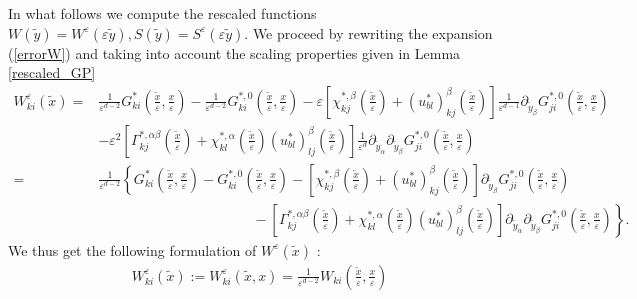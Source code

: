 \documentclass[11pt, reqno]{amsart}
\theoremstyle{definition}
\theoremstyle{remark}
\numberwithin{equation}{section}
\begin{document}
	
	\noindent	 In what follows we compute the rescaled  functions $W(\tilde{y})=W^\varepsilon(\varepsilon\tilde{y}),S(\tilde{y})=S^\varepsilon(\varepsilon\tilde{y})$.  We proceed by rewriting the expansion  (\ref{errorW})  and taking into account the scaling properties given in Lemma \ref{rescaled_GP}
	\begin{align*}
		W_{ki}^{\varepsilon} (\tilde{x})=&\frac{1}{\varepsilon^{d-2}}G^{*}_{ki}\!\!\left(\frac{\tilde{x}}{\varepsilon},\frac{x}{\varepsilon} \right)-\frac{1}{\varepsilon^{d-2}}G^{*,0}_{ki}\!\!\left(\frac{\tilde{x}}{\varepsilon},\frac{x}{\varepsilon} \right)-\varepsilon \left[\chi^{*,\beta}_{kj}\!\! \left(\frac{\tilde{x}}{\varepsilon} \right)+(u^*_{bl})^{\beta}_{kj} \!\!\left(\frac{\tilde{x}}{\varepsilon} \right)\right]\frac{1}{\varepsilon^{d-1}}\partial_{\tilde{y}_\beta} G^{*,0}_{ji}\!\!\left(\frac{\tilde{x}}{\varepsilon},\frac{x}{\varepsilon} \right)\\
		&-\varepsilon^2 \left[\Gamma^{*,\alpha\beta}_{kj}\left(\frac{\tilde{x}}{\varepsilon} \right)+ \chi^{*,\alpha}_{kl}\left(\frac{\tilde{x}}{\varepsilon} \right)(u^*_{bl})^{\beta}_{lj}\! \left(\frac{\tilde{x}}{\varepsilon} \right)\right] \frac{1}{\varepsilon^{d}} \partial_{\tilde{y}_\alpha} \partial_{\tilde{y}_\beta}G^{*,0}_{ji}\left(\frac{\tilde{x}}{\varepsilon},\frac{x}{\varepsilon} \right) \\
		=&\frac{1}{\varepsilon^{d-2}} \left\{ G_{ki}^* \left(\frac{\tilde{x}}{\varepsilon},\frac{x}{\varepsilon} \right)-G_{ki}^{*,0}\left(\frac{\tilde{x}}{\varepsilon},\frac{x}{\varepsilon} \right)\right.- \left[\chi^{*,\beta}_{kj} \left(\frac{\tilde{x}}{\varepsilon} \right)+(u^*_{bl})^{\beta}_{kj} \!\left(\frac{\tilde{x}}{\varepsilon} \right)\right]\partial_{\tilde{y}_\beta} G_{ji}^{*,0}\left(\frac{\tilde{x}}{\varepsilon}, \frac{x}{\varepsilon}\right)\\
		&\qquad\qquad\qquad\quad \qquad\qquad-\left. \left[\Gamma^{*,\alpha\beta}_{kj}\!\! \left(\frac{\tilde{x}}{\varepsilon} \right)+ \chi^{*,\alpha}_{kl}\!\!\left(\frac{\tilde{x}}{\varepsilon} \right)\! (u^*_{bl})^{\beta}_{lj}\!\left(\frac{\tilde{x}}{\varepsilon} \right)\right] \partial_{\tilde{y}_\alpha} \partial_{\tilde{y}_\beta}G^{*,0}_{ji}\!\!\left(\frac{\tilde{x}}{\varepsilon},\frac{x}{\varepsilon} \right) \right\}.
	\end{align*}
	We thus get the following formulation of $	W^{\varepsilon} (\tilde{x})$ :
	\begin{align*}
		W_{ki}^{\varepsilon}(\tilde{x}):=	W_{ki}^{\varepsilon}(\tilde{x},x)=\frac{1}{\varepsilon^{d-2}}W_{ki}\left(\frac{\tilde{x}}{\varepsilon},\frac{x}{\varepsilon} \right)
	\end{align*}
\end{document}
